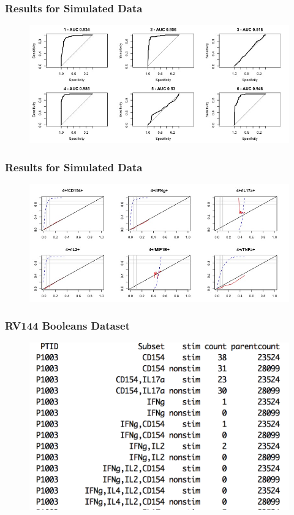 \documentclass{beamer}
\theoremstyle{definition}
\begin{document}

\begin{frame}
\frametitle{Results for Simulated Data}
\begin{figure}[]
\includegraphics[width=12 cm]{figures/simdataROC} 
\end{figure}
\end{frame}


\begin{frame}
\frametitle{Results for Simulated Data}
\begin{figure}[]
\includegraphics[width=12 cm]{figures/simdataFDR} 
\end{figure}
\end{frame}


\begin{frame}
\frametitle{RV144 Booleans Dataset}
\begin{figure}[]
\includegraphics[width=12 cm]{figures/datasetExample} \caption{}
\end{figure}
\end{frame}
\end{document}
